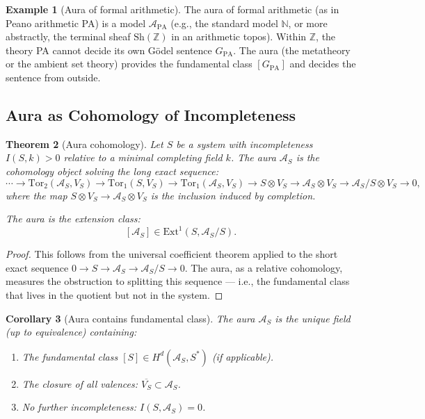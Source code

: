 \documentclass[12pt]{article}
\newtheorem{theorem}{Theorem}[section]
\newtheorem{corollary}[theorem]{Corollary}
\theoremstyle{definition}
\newtheorem{example}[theorem]{Example}
\theoremstyle{remark}
\newcommand{\Ext}{\mathrm{Ext}}
\newcommand{\Tor}{\mathrm{Tor}}
\begin{document}
\begin{example}[Aura of formal arithmetic]
The aura of formal arithmetic (as in Peano arithmetic PA) is a model $\mathcal{A}_{\text{PA}}$ (e.g., the standard model $\mathbb{N}$, or more abstractly, the terminal sheaf $\mathrm{Sh}(\mathbb{Z})$ in an arithmetic topos). Within $\mathbb{Z}$, the theory PA cannot decide its own G\"odel sentence $G_{\text{PA}}$. The aura (the metatheory or the ambient set theory) provides the fundamental class $[G_{\text{PA}}]$ and decides the sentence from outside.
\end{example}

\subsection{Aura as Cohomology of Incompleteness}

\begin{theorem}[Aura cohomology]
\label{thm:aura-cohomology}
Let $S$ be a system with incompleteness $I(S, k) > 0$ relative to a minimal completing field $k$. The aura $\mathcal{A}_S$ is the cohomology object solving the long exact sequence:
\[
\cdots \to \Tor_2(\mathcal{A}_S, V_S) \to \Tor_1(S, V_S) \to \Tor_1(\mathcal{A}_S, V_S) \to S \otimes V_S \to \mathcal{A}_S \otimes V_S \to \mathcal{A}_S / S \otimes V_S \to 0,
\]
where the map $S \otimes V_S \to \mathcal{A}_S \otimes V_S$ is the inclusion induced by completion.

The aura is the extension class:
\[
[\mathcal{A}_S] \in \Ext^1(S, \mathcal{A}_S / S).
\]
\end{theorem}

\begin{proof}
This follows from the universal coefficient theorem applied to the short exact sequence $0 \to S \to \mathcal{A}_S \to \mathcal{A}_S / S \to 0$. The aura, as a relative cohomology, measures the obstruction to splitting this sequence --- i.e., the fundamental class that lives in the quotient but not in the system.
\end{proof}

\begin{corollary}[Aura contains fundamental class]
The aura $\mathcal{A}_S$ is the unique field (up to equivalence) containing:
\begin{enumerate}
\item The fundamental class $[S] \in H^d(\mathcal{A}_S, S^*)$ (if applicable).
\item The closure of all valences: $\overline{V_S} \subset \mathcal{A}_S$.
\item No further incompleteness: $I(S, \mathcal{A}_S) = 0$.
\end{enumerate}
\end{corollary}
\end{document}
